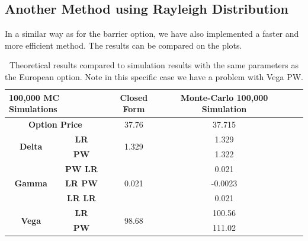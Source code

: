\documentclass[11pt,a4paper,fleqn]{article}
\begin{document}
\subsection{Another Method using Rayleigh Distribution}
 In a similar way as for the barrier option, we have also implemented a faster and more efficient method. The results can be compared on the plots.
\begin{table}[h!]
  \centering
\begin{tabular}{|c|c|c|c|c|c|}
\hline
\multicolumn{2}{|l|}{100,000 MC Simulations}& \textbf{Closed Form} & \textbf{Monte-Carlo 100,000 Simulation} \\ \hline
\multicolumn{2}{|c|}{\textbf{Option Price}}      & 37.76 &  37.715       \\ \hline
\multirow{2}{*}{\textbf{Delta}} & \textbf{LR}    & \multirow{2}{*}{1.329}                &1.329      \\
                                & \textbf{PW}    &                                          & 1.322              \\ \hline
\multirow{3}{*}{\textbf{Gamma}} & \textbf{PW LR} & \multirow{3}{*}{0.021}                 & 0.021       \\
                                & \textbf{LR PW} &                                           & -0.0023      \\
                                & \textbf{LR LR} &                                          & 0.021        \\ \hline
\multirow{2}{*}{\textbf{Vega}}  & \textbf{LR}    & \multirow{2}{*}{98.68} &    100.56      \\
                                & \textbf{PW}    &                                             &      111.02     \\ \hline
\end{tabular}
\caption{Theoretical results compared to simulation results with the same parameters as the European option. Note in this specific case we have a problem with Vega PW.}
\end{table}
\end{document}
